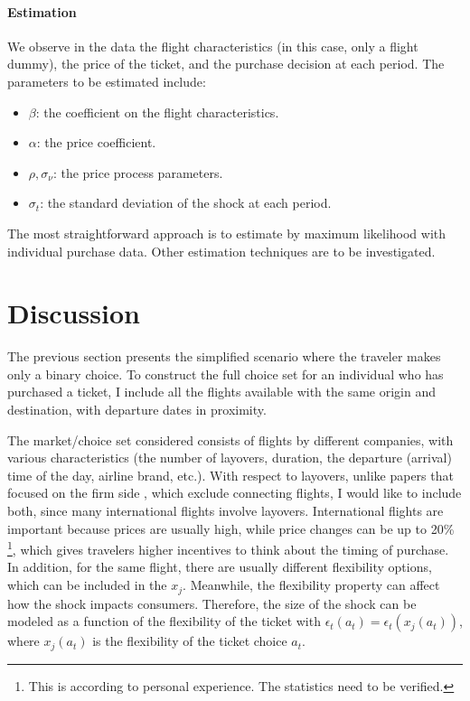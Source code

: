 \documentclass[12pt]{article}
\begin{document}
\paragraph{Estimation}
We observe in the data the flight characteristics (in this case, only a flight
dummy), the price of the ticket, and the purchase decision at each period. The
parameters to be estimated include:
\begin{itemize}
    \item $\beta$: the coefficient on the flight characteristics.
    \item $\alpha$: the price coefficient.
    \item $\rho,\sigma_{\nu}$: the price process parameters.
    \item $\sigma_t$: the standard deviation of the shock at each period.
\end{itemize}

The most straightforward approach is to estimate by maximum likelihood with
individual purchase data. Other estimation techniques are to be investigated.

\section{Discussion}

The previous section presents the simplified scenario where the traveler makes
only a binary choice. To construct the full choice set for an individual who
has purchased a ticket, I include all the flights available with the same
origin and destination, with departure dates in proximity.

The market/choice set considered consists of flights by different companies,
with various characteristics (the number of layovers, duration, the departure
(arrival) time of the day, airline brand, etc.). With respect to layovers,
unlike papers that focused on the firm side \citep{betancourt2022dynamic},
which exclude connecting flights, I would like to include both, since many
international flights involve layovers. International flights are important
because prices are usually high, while price changes can be up to 20\%
\footnote{This is according to personal experience. The statistics need to be
    verified.}, which gives travelers higher incentives to think about the timing
of purchase. In addition, for the same flight, there are usually different
flexibility options, which can be included in the $x_j$. Meanwhile, the
flexibility property can affect how the shock impacts consumers. Therefore, the
size of the shock can be modeled as a function of the flexibility of the ticket
with $\epsilon_t(a_t)=\epsilon_t(x_j(a_t))$, where $x_j(a_t)$ is the
flexibility of the ticket choice $a_t$.
\end{document}
